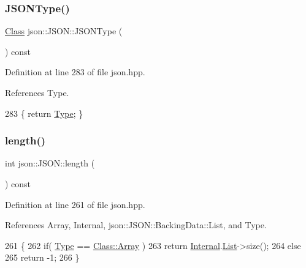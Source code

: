 \subsubsection{\texorpdfstring{J\+S\+O\+N\+Type()}{JSONType()}}
{\footnotesize\ttfamily \mbox{\hyperlink{classjson_1_1_j_s_o_n_a762f55df6d407c1af61607ed516ffe07}{Class}} json\+::\+J\+S\+O\+N\+::\+J\+S\+O\+N\+Type (\begin{DoxyParamCaption}{ }\end{DoxyParamCaption}) const\hspace{0.3cm}{\ttfamily [inline]}}



Definition at line 283 of file json.\+hpp.



References Type.


\begin{DoxyCode}
283 \{ \textcolor{keywordflow}{return} \mbox{\hyperlink{classjson_1_1_j_s_o_n_a3fa6923afa41bdfe38077fbc0079aaf5}{Type}}; \}
\end{DoxyCode}
\mbox{\label{classjson_1_1_j_s_o_n_a691d475ed40e6352ffaa9af37d664ff3}} 
\subsubsection{\texorpdfstring{length()}{length()}}
{\footnotesize\ttfamily int json\+::\+J\+S\+O\+N\+::length (\begin{DoxyParamCaption}{ }\end{DoxyParamCaption}) const\hspace{0.3cm}{\ttfamily [inline]}}



Definition at line 261 of file json.\+hpp.



References Array, Internal, json\+::\+J\+S\+O\+N\+::\+Backing\+Data\+::\+List, and Type.


\begin{DoxyCode}
261                            \{
262             \textcolor{keywordflow}{if}( \mbox{\hyperlink{classjson_1_1_j_s_o_n_a3fa6923afa41bdfe38077fbc0079aaf5}{Type}} == \mbox{\hyperlink{classjson_1_1_j_s_o_n_a762f55df6d407c1af61607ed516ffe07a4410ec34d9e6c1a68100ca0ce033fb17}{Class::Array}} )
263                 \textcolor{keywordflow}{return} \mbox{\hyperlink{classjson_1_1_j_s_o_n_a1e2a064794c3d55c8bb8887fc5734947}{Internal}}.\mbox{\hyperlink{unionjson_1_1_j_s_o_n_1_1_backing_data_ab85f5e7ad21f9f7a5407ab73128a3ebc}{List}}->size();
264             \textcolor{keywordflow}{else}
265                 \textcolor{keywordflow}{return} -1;
266         \}
\end{DoxyCode}
\mbox{\label{classjson_1_1_j_s_o_n_a799ab1cc68cb6e2a41ec948a9a2ecc37}} 
